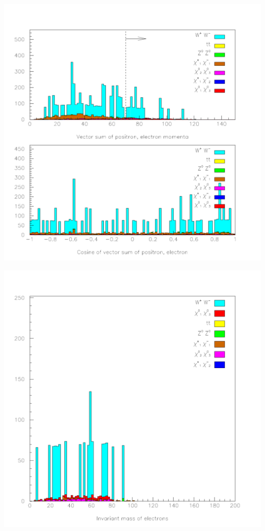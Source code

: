 \documentclass[landscape]{article}
\begin{document}
\begin{center} \includegraphics[height=\textheight]{pretty_7.pdf} \end{center}
\pagebreak

\begin{center} \includegraphics[height=\textheight]{pretty_8.pdf} \end{center}
\pagebreak
\end{document}

